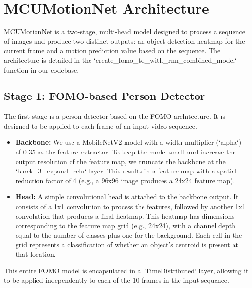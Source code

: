 \documentclass{article}
\begin{document}
\section{MCUMotionNet Architecture}
MCUMotionNet is a two-stage, multi-head model designed to process a sequence of images and produce two distinct outputs: an object detection heatmap for the current frame and a motion prediction value based on the sequence. The architecture is detailed in the `create_fomo_td_with_rnn_combined_model` function in our codebase.

\subsection{Stage 1: FOMO-based Person Detector}
The first stage is a person detector based on the FOMO architecture. It is designed to be applied to each frame of an input video sequence.
\begin{itemize}
    \item \textbf{Backbone:} We use a MobileNetV2 model with a width multiplier (`alpha`) of 0.35 as the feature extractor. To keep the model small and increase the output resolution of the feature map, we truncate the backbone at the `block_3_expand_relu` layer. This results in a feature map with a spatial reduction factor of 4 (e.g., a 96x96 image produces a 24x24 feature map).
    \item \textbf{Head:} A simple convolutional head is attached to the backbone output. It consists of a 1x1 convolution to process the features, followed by another 1x1 convolution that produces a final heatmap. This heatmap has dimensions corresponding to the feature map grid (e.g., 24x24), with a channel depth equal to the number of classes plus one for the background. Each cell in the grid represents a classification of whether an object's centroid is present at that location.
\end{itemize}
This entire FOMO model is encapsulated in a `TimeDistributed` layer, allowing it to be applied independently to each of the 10 frames in the input sequence.
\end{document}
